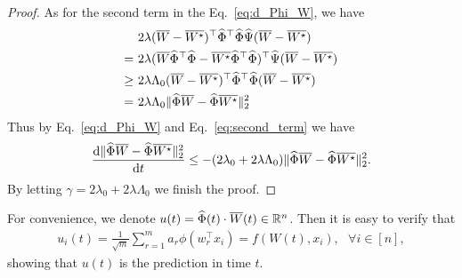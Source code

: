 \begin{proof}
As for the second term in the Eq.~\eqref{eq:d_Phi_W}, we have
\begin{align}
    \label{eq:second_term}
    & ~ 2\lambda (\overline{W} - \overline{W^{\star}})^{\top}\hat{\Phi}^{\top} \hat{\Phi} \hat{\Psi} (\overline{W} - \overline{W^{\star}}) \notag \\
    = & ~ 2\lambda (\overline{W}\hat{\Phi}^{\top} \hat{\Phi} - \overline{W^{\star}}\hat{\Phi}^{\top} \hat{\Phi})^{\top} \hat{\Psi} (\overline{W} - \overline{W^{\star}}) \notag \\
    \geq & ~ 2\lambda \Lambda_0 (\overline{W} - \overline{W^{\star}})^{\top}\hat{\Phi}^{\top} \hat{\Phi} (\overline{W} - \overline{W^{\star}}) \notag \\
    = & ~ 2\lambda \Lambda_0 \|\hat{\Phi} \overline{W} - \hat{\Phi}\overline{W^{\star}}\|_2^2
\end{align}
Thus by Eq.~\eqref{eq:d_Phi_W} and Eq.~\eqref{eq:second_term} we have
\begin{align*}
     \frac{\mathrm{d} \|\widehat{\Phi} \overline{W} -\widehat{\Phi} \overline{W^{\star}} \|_{2}^{2}}{\mathrm{d} t} \leq -(2\lambda_0 + 2\lambda \Lambda_0) \|\widehat{\Phi} \overline{W} - \widehat{\Phi}\overline{W^{\star}}\|_2^2.
\end{align*}
By letting $\gamma = 2\lambda_0 + 2\lambda \Lambda_0$ we finish the proof.







\end{proof}

For convenience, we denote $u(t) = \widehat{\Phi}(t) \cdot \overline{W}(t) \in \mathbb{R}^n$. Then it is easy to verify that
\begin{align*}
    u_i(t) = \frac{1}{\sqrt{m}}\sum_{r=1}^m a_r \phi(w_r^\top x_i) = f(W(t), x_i), ~~~\forall i\in [n],
\end{align*}
showing that $u(t)$ is the prediction in time $t$. %

